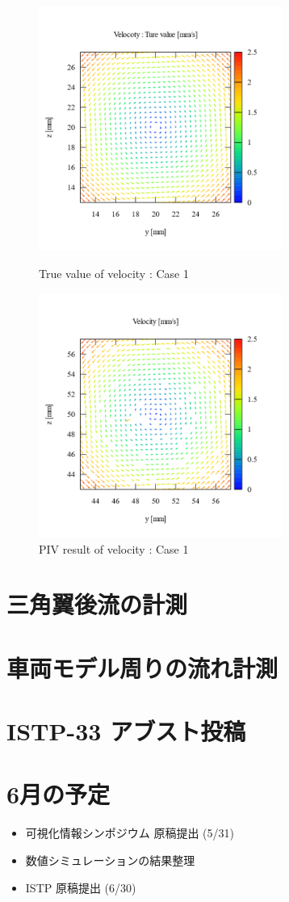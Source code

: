 \documentclass[twocolumn,a4j]{jsarticle}
\begin{document}
\begin{figure}[htbp]
  \footnotesize
  \begin{center}
    \includegraphics[width=80mm]{../images/vector_true_value.png}
    \caption{True value of velocity : Case 1}
    \includegraphics[width=80mm]{../images/vector_simulation.png}
    \caption{PIV result of velocity : Case 1}
  \end{center}
\end{figure}

\section{三角翼後流の計測}

\section{車両モデル周りの流れ計測}

\newpage

\section{ISTP-33 アブスト投稿}

\section{6月の予定}
\begin{itemize}
  \item 可視化情報シンポジウム 原稿提出 (5/31)
  \item 数値シミュレーションの結果整理
  \item ISTP 原稿提出 (6/30)
\end{itemize}
\end{document}
